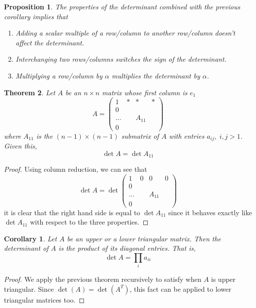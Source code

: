 \documentclass{article}
\newtheorem{theorem}{Theorem}[section]
\newtheorem{proposition}[theorem]{Proposition}
\newtheorem{corollary}{Corollary}[theorem]
\theoremstyle{remark}
\theoremstyle{definition}
\begin{document}
  \begin{proposition}
  The properties of the determinant combined with the previous corollary implies that 
  \begin{enumerate}
      \item Adding a scalar multiple of a row/column to another row/column doesn't affect the determinant. 
      \item Interchanging two rows/columns switches the sign of the determinant. 
      \item Multiplying a row/column by $\alpha$ multiplies the determinant by $\alpha$. 
  \end{enumerate}
  \end{proposition}

  \begin{theorem}
  Let $A$ be an $n \times n$ matrix whose first column is $e_1$
  \[A = \begin{pmatrix}
  1&*&*&* \\
  0 &&& \\
  \ldots& & A_{11}& \\
  0&&&
  \end{pmatrix}\]
  where $A_{11}$ is the $(n-1) \times (n-1)$ submatrix of $A$ with entries $a_{i j}, \; i, j > 1$. Given this, 
  \[\det{A} = \det{A_{11}}\]
  \end{theorem}
  \begin{proof}
  Using column reduction, we can see that 
  \[ \det{A} = \det{\begin{pmatrix}
  1&0&0&0 \\
  0 &&& \\
  \ldots& & A_{11}& \\
  0&&&
  \end{pmatrix}}\]
  it is clear that the right hand side is equal to $\det{A_{11}}$ since it behaves exactly like $\det{A_{11}}$ with respect to the three properties. 
  \end{proof}

  \begin{corollary}
  Let $A$ be an upper or a lower triangular matrix. Then the determinant of $A$ is the product of its diagonal entries. That is,  
  \[ \det{A} = \prod_{i} a_{i i}\]
  \end{corollary}
  \begin{proof}
  We apply the previous theorem recursively to satisfy when $A$ is upper triangular. Since $\det{(A)} = \det{(A^T)}$, this fact can be applied to lower triangular matrices too. 
  \end{proof}
\end{document}
